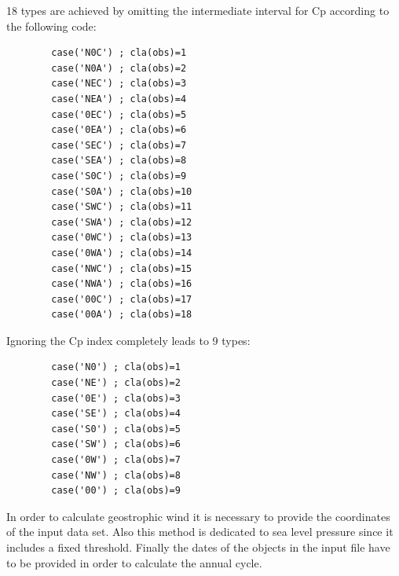\documentclass[12pt, oneside, a4paper, headsepline, plainheadsepline]{scrbook}
\begin{document}
18 types are achieved by omitting the intermediate interval for Cp according to the following code:
\begin{scriptsize}
\begin{lstlisting}
        case('N0C') ; cla(obs)=1
        case('N0A') ; cla(obs)=2
        case('NEC') ; cla(obs)=3
        case('NEA') ; cla(obs)=4
        case('0EC') ; cla(obs)=5
        case('0EA') ; cla(obs)=6
        case('SEC') ; cla(obs)=7
        case('SEA') ; cla(obs)=8
        case('S0C') ; cla(obs)=9
        case('S0A') ; cla(obs)=10
        case('SWC') ; cla(obs)=11
        case('SWA') ; cla(obs)=12
        case('0WC') ; cla(obs)=13
        case('0WA') ; cla(obs)=14
        case('NWC') ; cla(obs)=15
        case('NWA') ; cla(obs)=16
        case('00C') ; cla(obs)=17
        case('00A') ; cla(obs)=18
\end{lstlisting}
\end{scriptsize}

Ignoring the Cp index completely leads to 9 types:
\begin{scriptsize}
\begin{lstlisting}
        case('N0') ; cla(obs)=1
        case('NE') ; cla(obs)=2
        case('0E') ; cla(obs)=3
        case('SE') ; cla(obs)=4
        case('S0') ; cla(obs)=5
        case('SW') ; cla(obs)=6
        case('0W') ; cla(obs)=7
        case('NW') ; cla(obs)=8
        case('00') ; cla(obs)=9
\end{lstlisting}
\end{scriptsize}

In order to calculate geostrophic wind it is necessary to provide the coordinates of the input data set.
Also this method is dedicated to sea level pressure since it includes a fixed threshold. Finally the dates of the objects in the input file have to be provided in order to calculate the annual cycle.
\end{document}
